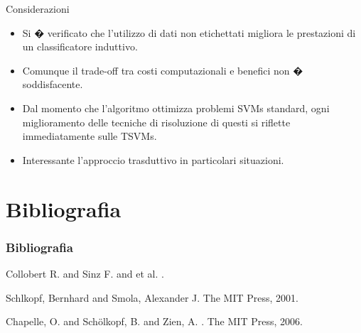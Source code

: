 \documentclass[mathserif]{beamer}
\begin{document}
\begin{frame}{Considerazioni}
\begin{block}{}
\begin{itemize}
	\item<1-> Si � verificato che l'utilizzo di dati non etichettati migliora le prestazioni di un classificatore induttivo.
	\item<1-> Comunque il trade-off tra costi computazionali e benefici non � soddisfacente.
	\item<1-> Dal momento che l'algoritmo ottimizza problemi SVMs standard, ogni miglioramento delle tecniche di risoluzione di questi si riflette immediatamente sulle TSVMs.  
	\item<1-> Interessante l'approccio trasduttivo in particolari situazioni.
\end{itemize}
\end{block}
\end{frame}




\section{Bibliografia}

\begin{frame}
	\frametitle{Bibliografia}
	
		\begin{thebibliography}{}
				\footnotesize
				
			 	Collobert R. and Sinz F. and et al.  
				.
				
				Schlkopf, Bernhard   and Smola, Alexander  J. 
				\newblock The MIT Press, 2001.
				
				Chapelle, O.  and Sch\"{o}lkopf, B.  and Zien, A. 
				.
				\newblock The MIT Press, 2006.


\end{thebibliography}
\end{frame}
\end{document}
